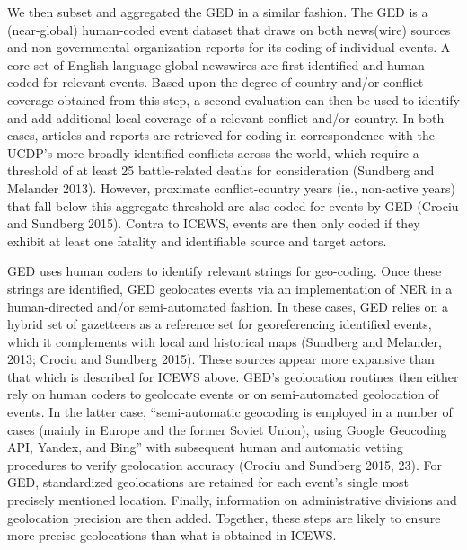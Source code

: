 \documentclass[12pt]{article}
\begin{document}
We then subset and aggregated the GED in a similar fashion. The GED is a (near-global) human-coded event dataset that draws on both news(wire) sources and non-governmental organization reports for its coding of individual events.  A core set of English-language global newswires are first identified and human coded for relevant events. Based upon the degree of country and/or conflict coverage obtained from this step, a second evaluation can then be used to identify and add additional local coverage of a relevant conflict and/or country. In both cases, articles and reports are retrieved for coding in correspondence with the UCDP's more broadly identified conflicts across the world, which require a threshold of at least 25 battle-related deaths for consideration (Sundberg and Melander 2013). However, proximate conflict-country years (ie., non-active years) that fall below this aggregate threshold are also coded for events by GED (Crociu and Sundberg 2015). Contra to ICEWS, events are then only coded if they exhibit at least one fatality and identifiable source and target actors.

GED uses human coders to identify relevant strings for geo-coding. Once these strings are identified, GED geolocates events via an implementation of NER in a human-directed and/or semi-automated fashion. In these cases, GED relies on a hybrid set of gazetteers as a reference set for georeferencing identified events, which it complements with local and historical maps (Sundberg and Melander, 2013; Crociu and Sundberg 2015). These sources appear more expansive than that which is described for ICEWS above. GED's geolocation routines then either rely on human coders to geolocate events or on semi-automated geolocation of events. In the latter case, ``semi-automatic geocoding is employed in a number of cases (mainly in Europe and the former Soviet Union), using Google Geocoding API, Yandex, and Bing'' with subsequent human and automatic vetting procedures to verify geolocation accuracy (Crociu and Sundberg 2015, 23). For GED, standardized geolocations are retained for each event's single most precisely mentioned location. Finally, information on administrative divisions and geolocation precision are then added. Together, these steps are likely to ensure more precise geolocations than what is obtained in ICEWS.
\end{document}
